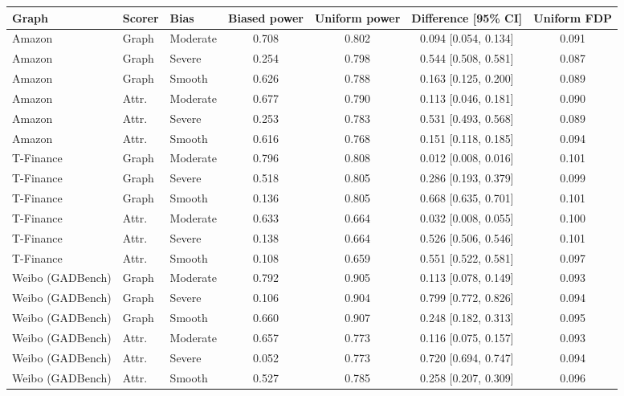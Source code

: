 \begin{tabular}{lllcccc}
\toprule
Graph & Scorer & Bias & Biased power & Uniform power & Difference [95\% CI] & Uniform FDP\\
\midrule
Amazon & Graph & Moderate & 0.708 & 0.802 & 0.094 [0.054, 0.134] & 0.091\\
Amazon & Graph & Severe & 0.254 & 0.798 & 0.544 [0.508, 0.581] & 0.087\\
Amazon & Graph & Smooth & 0.626 & 0.788 & 0.163 [0.125, 0.200] & 0.089\\
Amazon & Attr. & Moderate & 0.677 & 0.790 & 0.113 [0.046, 0.181] & 0.090\\
Amazon & Attr. & Severe & 0.253 & 0.783 & 0.531 [0.493, 0.568] & 0.089\\
Amazon & Attr. & Smooth & 0.616 & 0.768 & 0.151 [0.118, 0.185] & 0.094\\
\midrule
T-Finance & Graph & Moderate & 0.796 & 0.808 & 0.012 [0.008, 0.016] & 0.101\\
T-Finance & Graph & Severe & 0.518 & 0.805 & 0.286 [0.193, 0.379] & 0.099\\
T-Finance & Graph & Smooth & 0.136 & 0.805 & 0.668 [0.635, 0.701] & 0.101\\
T-Finance & Attr. & Moderate & 0.633 & 0.664 & 0.032 [0.008, 0.055] & 0.100\\
T-Finance & Attr. & Severe & 0.138 & 0.664 & 0.526 [0.506, 0.546] & 0.101\\
T-Finance & Attr. & Smooth & 0.108 & 0.659 & 0.551 [0.522, 0.581] & 0.097\\
\midrule
Weibo (GADBench) & Graph & Moderate & 0.792 & 0.905 & 0.113 [0.078, 0.149] & 0.093\\
Weibo (GADBench) & Graph & Severe & 0.106 & 0.904 & 0.799 [0.772, 0.826] & 0.094\\
Weibo (GADBench) & Graph & Smooth & 0.660 & 0.907 & 0.248 [0.182, 0.313] & 0.095\\
Weibo (GADBench) & Attr. & Moderate & 0.657 & 0.773 & 0.116 [0.075, 0.157] & 0.093\\
Weibo (GADBench) & Attr. & Severe & 0.052 & 0.773 & 0.720 [0.694, 0.747] & 0.094\\
Weibo (GADBench) & Attr. & Smooth & 0.527 & 0.785 & 0.258 [0.207, 0.309] & 0.096\\
\bottomrule
\end{tabular}
